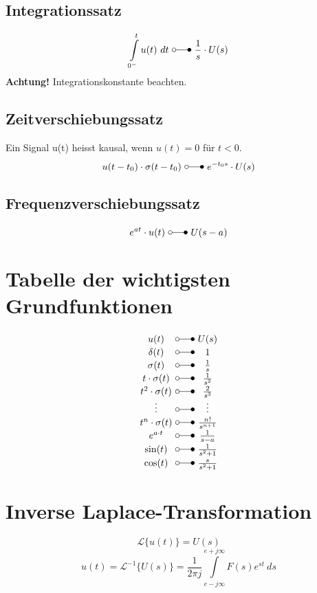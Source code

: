 \subsection{Integrationssatz}
\[ 
    \int\limits_{0^-}^{t} u(t) ~ dt ~ \laplace ~ \frac{1}{s} \cdot U(s) 
\]
\textbf{Achtung!} Integrationskonstante beachten. 

\subsection{Zeitverschiebungssatz}
Ein Signal u(t) heisst kausal, wenn $u(t) = 0$ für $t < 0$.
\[ 
    u(t - t_0) \cdot \sigma(t - t_0) ~ \laplace ~ e^{-t_0s} \cdot U(s) 
\]

\subsection{Frequenzverschiebungssatz}
\[ 
    e^{at} \cdot u(t)  ~ \laplace ~ U(s - a)
\]

\section{Tabelle der wichtigsten Grundfunktionen}
\[ 
    \begin{array}{c@{ ~ \laplace ~ }c}
        u(t) 
            & U(s) \\
        \delta(t) 
            & 1 \\
        \sigma(t) 
            & \frac{1}{s} \\
        t \cdot \sigma(t) 
            & \frac{1}{s^2} \\
        t^2 \cdot \sigma(t) 
            & \frac{2}{s^3} \\
        \vdots 
            & \vdots \\
        t^n \cdot \sigma(t) 
            & \frac{n!}{s^{n+1}} \\
        e^{a \cdot t} 
            & \frac{1}{s - a} \\
        \sin(t) 
            & \frac{1}{s^2 + 1} \\
        \cos(t) 
            & \frac{s}{s^2 + 1} \\
    \end{array} 
\]

\section{Inverse Laplace-Transformation}
\[ 
    \mathcal{L} \lbrace u(t) \rbrace = U(s)
\]
\[ 
    u(t) = \mathcal{L}^{-1} \lbrace U(s) \rbrace
    = \frac{1}{2\pi j} \int\limits_{e-j\infty}^{e+j\infty} F(s) e^{st} ~ ds
\]

